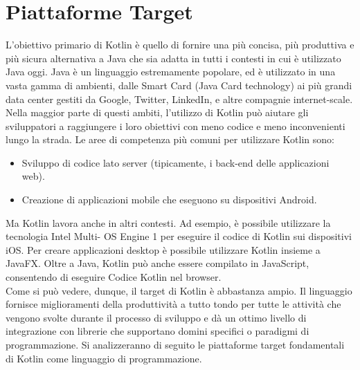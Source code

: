 \section{Piattaforme Target}
L'obiettivo primario di Kotlin è quello di fornire una più concisa, più produttiva e più sicura alternativa a Java che sia adatta in tutti i contesti in cui è utilizzato Java oggi. Java è un linguaggio estremamente popolare, ed è utilizzato in una vasta gamma di ambienti, dalle Smart Card (Java Card technology) ai più grandi data center gestiti da Google, Twitter, LinkedIn, e altre compagnie internet-scale. Nella maggior parte di questi ambiti, l'utilizzo di Kotlin può aiutare gli sviluppatori a raggiungere i loro obiettivi con meno codice e meno inconvenienti lungo la strada. Le aree di competenza più comuni per utilizzare Kotlin sono:
\begin{itemize}
  \item Sviluppo di codice lato server (tipicamente, i back-end delle applicazioni web).
  \item Creazione di applicazioni mobile che eseguono su dispositivi Android.
\end{itemize}
Ma Kotlin lavora anche in altri contesti. Ad esempio, è possibile utilizzare la tecnologia Intel Multi- OS Engine 1 per eseguire il codice di Kotlin sui dispositivi iOS. Per creare applicazioni desktop è possibile utilizzare Kotlin insieme a JavaFX. Oltre a Java, Kotlin può anche essere compilato in JavaScript, consentendo di eseguire Codice Kotlin nel browser.\\
Come si può vedere, dunque, il target di Kotlin è abbastanza ampio. Il linguaggio fornisce miglioramenti della produttività a tutto tondo per tutte le attività che vengono svolte durante il processo di sviluppo e dà un ottimo livello di integrazione con librerie che supportano domini specifici o paradigmi di programmazione. Si analizzeranno di seguito le piattaforme target fondamentali di Kotlin come linguaggio di programmazione.\\


